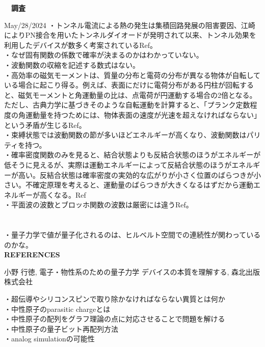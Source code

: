 \documentclass[a4paper,10.5pt]{ltjsarticle}
\begin{document}
\centerline
{\huge \bfseries　調査}
\rightline
{May/28/2024}
\leftline
{}
・トンネル電流による熱の発生は集積回路発展の阻害要因、江崎によりPN接合を用いたトンネルダイオードが発明されて以来、トンネル効果を利用したデバイスが数多く考案されているRef\cite{1}。\\
・なぜ固有関数の係数で確率が決まるのかはわかっていない。\\
・波動関数の収縮を記述する数式はない。\\
・高効率の磁気モーメントは、質量の分布と電荷の分布が異なる物体が自転している場合に起こり得る。例えば、表面にだけに電荷分布がある円柱が回転すると、磁気モーメントと角運動量の比は、点電荷が円運動する場合の2倍となる。ただし、古典力学に基づきそのような自転運動を計算すると、「プランク定数程度の角運動量を持つためには、物体表面の速度が光速を超えなければならない」という矛盾が生じるRef\cite{1}。\\
・束縛状態では波動関数の節が多いほどエネルギーが高くなり、波動関数はパリティを持つ。\\
・確率密度関数のみを見ると、結合状態よりも反結合状態のほうがエネルギーが低そうに見えるが、実際は運動エネルギーによって反結合状態のほうがエネルギーが高い。反結合状態は確率密度の実効的な広がりが小さく位置のばらつきが小さい。不確定原理を考えると、運動量のばらつきが大きくなるはずだから運動エネルギーが高くなる。Ref\cite{1}\\
・平面波の波数とブロッホ関数の波数は厳密には違うRef\cite{1}。\\
\\
\\
・量子力学で値が量子化されるのは、ヒルベルト空間での連続性が関わっているのかな。\\
\clearpage
{\Large \bfseries REFERENCES}
\begin{thebibliography}{1}
\vspace{-1.5cm}
   小野 行徳, 電子・物性系のための量子力学 デバイスの本質を理解する, 森北出版株式会社

\end{thebibliography}
\vspace{50pt}
・超伝導やシリコンスピンで取り除かなければならない異質とは何か\\
・中性原子のparasitic chargeとは\\
・中性原子の配列をグラフ理論の点に対応させることで問題を解ける\\
・中性原子の量子ビット再配列方法\\
・analog simulationの可能性\\
\end{document}
